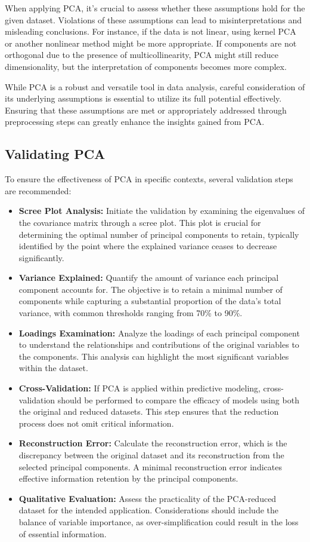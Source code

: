 \documentclass[sigconf]{acmart}
\begin{document}
When applying PCA, it's crucial to assess whether these assumptions hold for the given dataset. Violations of these assumptions can lead to misinterpretations and misleading conclusions. For instance, if the data is not linear, using kernel PCA or another nonlinear method might be more appropriate. If components are not orthogonal due to the presence of multicollinearity, PCA might still reduce dimensionality, but the interpretation of components becomes more complex.

While PCA is a robust and versatile tool in data analysis, careful consideration of its underlying assumptions is essential to utilize its full potential effectively. Ensuring that these assumptions are met or appropriately addressed through preprocessing steps can greatly enhance the insights gained from PCA.


\subsection{Validating PCA}

To ensure the effectiveness of PCA in specific contexts, several validation steps are recommended:

\begin{itemize}
  \item \textbf{Scree Plot Analysis:} Initiate the validation by examining the eigenvalues of the covariance matrix through a scree plot. This plot is crucial for determining the optimal number of principal components to retain, typically identified by the point where the explained variance ceases to decrease significantly.
  \item \textbf{Variance Explained:} Quantify the amount of variance each principal component accounts for. The objective is to retain a minimal number of components while capturing a substantial proportion of the data's total variance, with common thresholds ranging from 70\% to 90\%.
  \item \textbf{Loadings Examination:} Analyze the loadings of each principal component to understand the relationships and contributions of the original variables to the components. This analysis can highlight the most significant variables within the dataset.
  \item \textbf{Cross-Validation:} If PCA is applied within predictive modeling, cross-validation should be performed to compare the efficacy of models using both the original and reduced datasets. This step ensures that the reduction process does not omit critical information.
  \item \textbf{Reconstruction Error:} Calculate the reconstruction error, which is the discrepancy between the original dataset and its reconstruction from the selected principal components. A minimal reconstruction error indicates effective information retention by the principal components.
  \item \textbf{Qualitative Evaluation:} Assess the practicality of the PCA-reduced dataset for the intended application. Considerations should include the balance of variable importance, as over-simplification could result in the loss of essential information.
\end{itemize}
\end{document}
